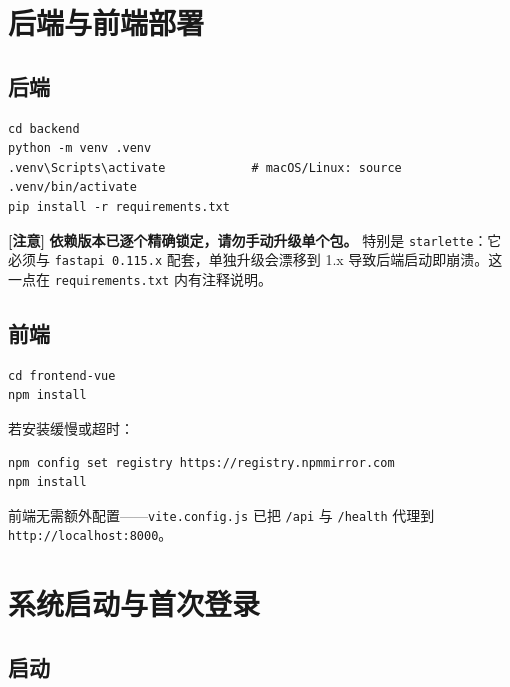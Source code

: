 \documentclass[UTF8,a4paper,11pt]{ctexrep}
\newcommand{\warnmark}{\textcolor{todobar}{\textbf{[注意]}}}
\begin{document}
\section{后端与前端部署}


\subsection{后端}

\begin{Verbatim}[breaklines=true,breakanywhere=true,fontsize=\small,frame=single,framesep=4pt,rulecolor=\color{codeframe}]
cd backend
python -m venv .venv
.venv\Scripts\activate            # macOS/Linux: source .venv/bin/activate
pip install -r requirements.txt
\end{Verbatim}

\begin{todobox}
\warnmark{} \textbf{依赖版本已逐个精确锁定，请勿手动升级单个包。} 特别是 \texttt{starlette}：它必须与 \texttt{fastapi 0.115.x} 配套，单独升级会漂移到 1.x 导致后端启动即崩溃。这一点在 \texttt{requirements.txt} 内有注释说明。

\end{todobox}


\subsection{前端}

\begin{Verbatim}[breaklines=true,breakanywhere=true,fontsize=\small,frame=single,framesep=4pt,rulecolor=\color{codeframe}]
cd frontend-vue
npm install
\end{Verbatim}

若安装缓慢或超时：

\begin{Verbatim}[breaklines=true,breakanywhere=true,fontsize=\small,frame=single,framesep=4pt,rulecolor=\color{codeframe}]
npm config set registry https://registry.npmmirror.com
npm install
\end{Verbatim}

前端无需额外配置——\texttt{vite.config.js} 已把 \texttt{/api} 与 \texttt{/health} 代理到 \texttt{http://localhost:8000}。


\section{系统启动与首次登录}


\subsection{启动}
\end{document}
